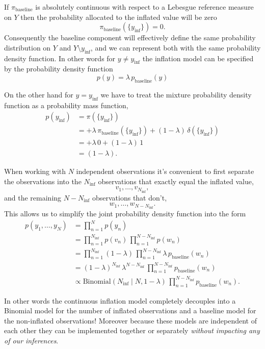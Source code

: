 \documentclass[
  letterpaper,
  DIV=11,
  numbers=noendperiod]{scrartcl}
\begin{document}
If \(\pi_{\mathrm{baseline}}\) is absolutely continuous with respect to
a Lebesgue reference measure on \(Y\) then the probability allocated to
the inflated value will be zero \[
\pi_{\mathrm{baseline}}( \{ y_{\mathrm{inf}} \} ) = 0.
\] Consequently the baseline component will effectively define the same
probability distribution on \(Y\) and \(Y \setminus y_{\mathrm{inf}}\),
and we can represent both with the same probability density function. In
other words for \(y \ne y_{\mathrm{inf}}\) the inflation model can be
specified by the probability density function \[
p(y)
=
\lambda \, p_{\mathrm{baseline}}(y)
\]

On the other hand for \(y = y_{\mathrm{inf}}\) we have to treat the
mixture probability density function as a probability mass function,
\begin{align*}
p( y_{\mathrm{inf}} )
&=
\pi( \{ y_{\mathrm{inf}} \} )
\\
&=
+ \lambda \, \pi_{\mathrm{baseline}}( \{ y_{\mathrm{inf}} \} )
+ (1 - \lambda) \, \delta( \{ y_{\mathrm{inf}} \} )
\\
&=
+ \lambda \, 0
+ (1 - \lambda) \, 1
\\
&=
(1 - \lambda).
\end{align*}

When working with \(N\) independent observations it's convenient to
first separate the observations into the \(N_{\mathrm{inf}}\)
observations that exactly equal the inflated value, \[
v_{1}, \ldots, v_{N_{\mathrm{inf}}},
\] and the remaining \(N - N_{\mathrm{inf}}\) observations that don't,
\[
w_{1}, \ldots, w_{N - N_{\mathrm{inf}}}.
\] This allows us to simplify the joint probability density function
into the form \begin{align*}
p(y_{1}, \ldots, y_{N})
&=
\prod_{n = 1}^{N} p(y_{n})
\\
&=
\prod_{n = 1}^{N_{\mathrm{inf}}} p(v_{n}) \,
\prod_{n = 1}^{N - N_{\mathrm{inf}}} p(w_{n})
\\
&=
\prod_{n = 1}^{N_{\mathrm{inf}}} (1 - \lambda) \,
\prod_{n = 1}^{N - N_{\mathrm{inf}}} \lambda \, p_{\mathrm{baseline}}(w_{n})
\\
&=
(1 - \lambda)^{N_{\mathrm{inf}}} \,
\lambda^{N - N_{\mathrm{inf}}} \,
\prod_{n = 1}^{N - N_{\mathrm{inf}}} p_{\mathrm{baseline}}(w_{n})
\\
&\propto
\mathrm{Binomial}(N_{\mathrm{inf}} \mid N, 1 - \lambda) \,
\prod_{n = 1}^{N - N_{\mathrm{inf}}} p_{\mathrm{baseline}}(w_{n}).
\end{align*}

In other words the continuous inflation model completely decouples into
a Binomial model for the number of inflated observations and a baseline
model for the non-inflated observations! Moreover because these models
are independent of each other they can be implemented together or
separately \emph{without impacting any of our inferences}.
\end{document}
